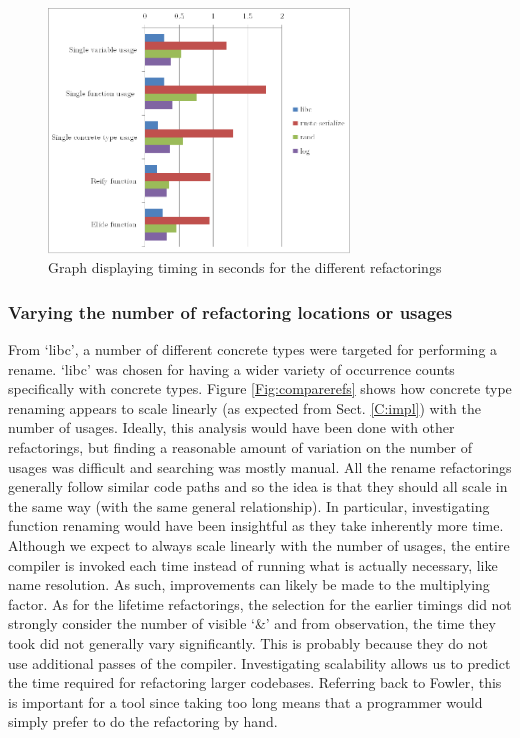 \begin{figure}[h]
\begin{center}

\includegraphics[width=8cm]{refactorings}

\caption{Graph displaying timing in seconds for the different refactorings}
\label{Fig:compareref}
\end{center}
\end{figure}

\subsubsection{Varying the number of refactoring locations or usages}
From `libc', a number of different concrete types were targeted for performing a rename. `libc' was chosen for having a wider variety of occurrence counts specifically with concrete types. Figure \ref{Fig:comparerefs} shows how concrete type renaming appears to scale linearly (as expected from Sect. \ref{C:impl}) with the number of usages. Ideally, this analysis would have been done with other refactorings, but finding a reasonable amount of variation on the number of usages was difficult and searching was mostly manual. All the rename refactorings generally follow similar code paths and so the idea is that they should all scale in the same way (with the same general relationship). In particular, investigating function renaming would have been insightful as they take inherently more time. Although we expect to always scale linearly with the number of usages, the entire compiler is invoked each time instead of running what is actually necessary, like name resolution. As such, improvements can likely be made to the multiplying factor. As for the lifetime refactorings, the selection for the earlier timings did not strongly consider the number of visible `\&' and from observation, the time they took did not generally vary significantly. This is probably because they do not use additional passes of the compiler. Investigating scalability allows us to predict the time required for refactoring larger codebases. Referring back to Fowler, this is important for a tool since taking too long means that a programmer would simply prefer to do the refactoring by hand.

